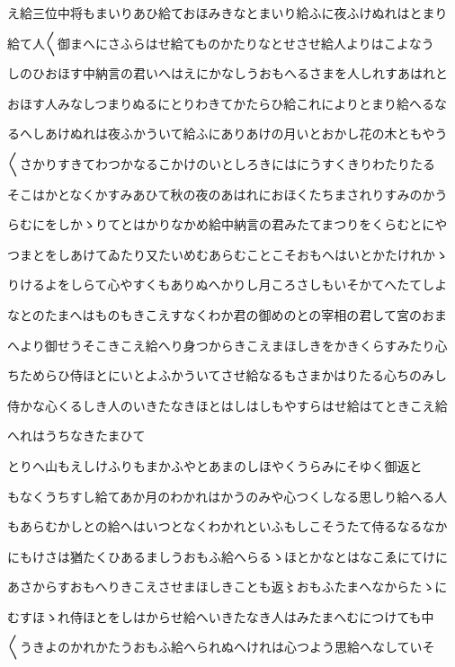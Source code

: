 \documentclass[a4paper,11pt,landscape]{ltjtarticle}
\begin{document}
え給三位中将もまいりあひ給ておほみきなとまいり給ふに夜ふけぬれはとまり
\par\medskip
給て人〱御まへにさふらはせ給てものかたりなとせさせ給人よりはこよなう
\par\medskip
しのひおほす中納言の君いへはえにかなしうおもへるさまを人しれすあはれと
\par\medskip
おほす人みなしつまりぬるにとりわきてかたらひ給これによりとまり給へるな
\par\medskip
るへしあけぬれは夜ふかういて給ふにありあけの月いとおかし花の木ともやう
\par\medskip
〱さかりすきてわつかなるこかけのいとしろきにはにうすくきりわたりたる
\par\medskip
そこはかとなくかすみあひて秋の夜のあはれにおほくたちまされりすみのかう
\par\medskip
らむにをしかゝりてとはかりなかめ給中納言の君みたてまつりをくらむとにや
\par\medskip
つまとをしあけてゐたり又たいめむあらむことこそおもへはいとかたけれかゝ
\par\medskip
りけるよをしらて心やすくもありぬへかりし月ころさしもいそかてへたてしよ
\par\medskip
なとのたまへはものもきこえすなくわか君の御めのとの宰相の君して宮のおま
\par\medskip
へより御せうそこきこえ給へり身つからきこえまほしきをかきくらすみたり心
\par\medskip
ちためらひ侍ほとにいとよふかういてさせ給なるもさまかはりたる心ちのみし
\par\medskip
侍かな心くるしき人のいきたなきほとはしはしもやすらはせ給はてときこえ給
\par\medskip
へれはうちなきたまひて
\par\medskip
とりへ山もえしけふりもまかふやとあまのしほやくうらみにそゆく御返と
\par\medskip
もなくうちすし給てあか月のわかれはかうのみや心つくしなる思しり給へる人
\par\medskip
もあらむかしとの給へはいつとなくわかれといふもしこそうたて侍るなるなか
\par\medskip
にもけさは猶たくひあるましうおもふ給へらるゝほとかなとはなこゑにてけに
\par\medskip
あさからすおもへりきこえさせまほしきことも返〻おもふたまへなからたゝに
\par\medskip
むすほゝれ侍ほとをしはからせ給へいきたなき人はみたまへむにつけても中
\par\medskip
〱うきよのかれかたうおもふ給へられぬへけれは心つよう思給へなしていそ
\end{document}
